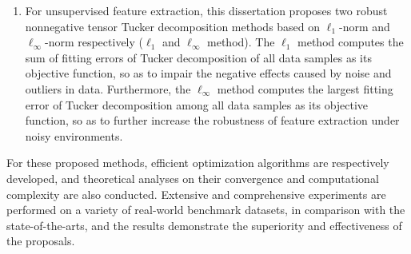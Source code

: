 \begin{eabstract}
\begin{enumerate}[wide]
    \item For unsupervised feature extraction, this dissertation proposes two robust nonnegative tensor Tucker decomposition methods based on $\ell_{1}$-norm and $\ell_{\infty}$-norm respectively ($\ell_{1}$ and $\ell_{\infty}$ method). The $\ell_{1}$ method computes the sum of fitting errors of Tucker decomposition of all data samples as its objective function, so as to impair the negative effects caused by noise and outliers in data. Furthermore, the $\ell_{\infty}$ method computes the largest fitting error of Tucker decomposition among all data samples as its objective function, so as to further increase the robustness of feature extraction under noisy environments.
\end{enumerate}
For these proposed methods, efficient optimization algorithms are respectively developed, and theoretical analyses on their convergence and computational complexity are also conducted. Extensive and comprehensive experiments are performed on a variety of real-world benchmark datasets, in comparison with the state-of-the-arts, and the results demonstrate the superiority and effectiveness of the proposals.

\end{eabstract}


